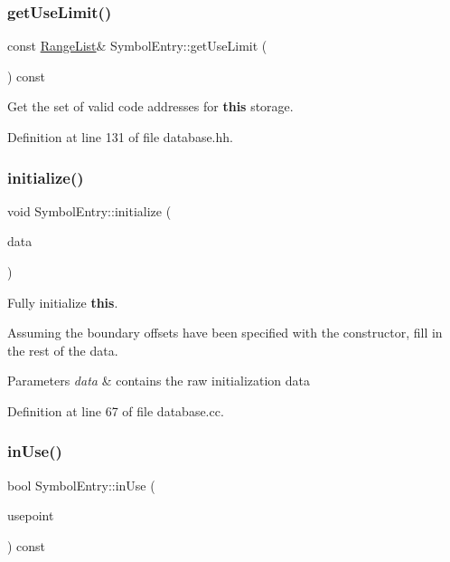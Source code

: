 \subsubsection{\texorpdfstring{getUseLimit()}{getUseLimit()}}
{\footnotesize\ttfamily const \mbox{\hyperlink{class_range_list}{Range\+List}}\& Symbol\+Entry\+::get\+Use\+Limit (\begin{DoxyParamCaption}\item[{void}]{ }\end{DoxyParamCaption}) const\hspace{0.3cm}{\ttfamily [inline]}}



Get the set of valid code addresses for {\bfseries{this}} storage. 



Definition at line 131 of file database.\+hh.

\mbox{\label{class_symbol_entry_a46693677a8ea05b33472f8a1714efbb7}} 
\subsubsection{\texorpdfstring{initialize()}{initialize()}}
{\footnotesize\ttfamily void Symbol\+Entry\+::initialize (\begin{DoxyParamCaption}\item[{const \mbox{\hyperlink{class_symbol_entry_1_1_entry_init_data}{Entry\+Init\+Data}} \&}]{data }\end{DoxyParamCaption})}



Fully initialize {\bfseries{this}}. 

Assuming the boundary offsets have been specified with the constructor, fill in the rest of the data. 
\begin{DoxyParams}{Parameters}
{\em data} & contains the raw initialization data \\
\hline
\end{DoxyParams}


Definition at line 67 of file database.\+cc.

\mbox{\label{class_symbol_entry_a389ffcfb36cee3c49b63fdac6be92bee}} 
\subsubsection{\texorpdfstring{inUse()}{inUse()}}
{\footnotesize\ttfamily bool Symbol\+Entry\+::in\+Use (\begin{DoxyParamCaption}\item[{const \mbox{\hyperlink{class_address}{Address}} \&}]{usepoint }\end{DoxyParamCaption}) const}



